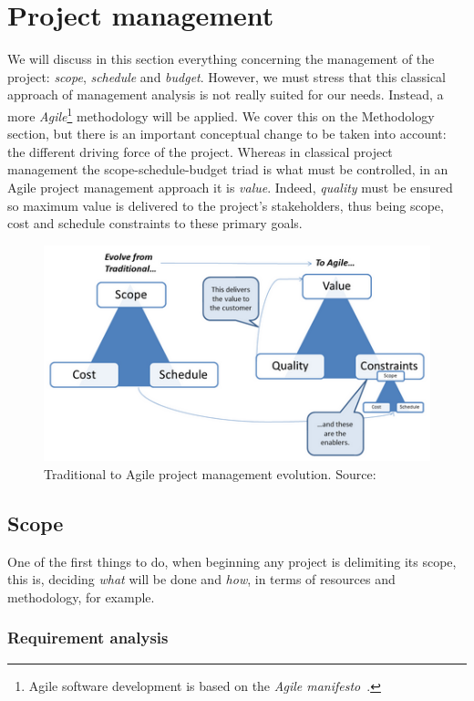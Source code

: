 \section{Project management}
\label{section:project_management}

We will discuss in this section everything concerning the management of the project: \textit{scope}, \textit{schedule} and \textit{budget}. However, we must stress that this classical approach of management analysis is not really suited for our needs. Instead, a more \textit{Agile}\footnote{Agile software development is based on the \textit{Agile manifesto}~\cite{website:AgileManifesto}.} methodology will be applied. We cover this on the Methodology section, but there is an important conceptual change to be taken into account: the different driving force of the project. Whereas in classical project management the scope-schedule-budget triad is what must be controlled, in an Agile project management approach it is \textit{value}. Indeed, \textit{quality} must be ensured so maximum value is delivered to the project's stakeholders, thus being scope, cost and schedule constraints to these primary goals.

\begin{figure}[h]
	\centering
	\includegraphics[width=0.7\linewidth]{figures/agiletriangle-1.png}
	\caption{Traditional to Agile project management evolution. Source:~\cite{website:AgileTriangle}}
	\label{fig:agile-pm}
\end{figure}

\subsection{Scope}
\label{section:scope}

One of the first things to do, when beginning any project is delimiting its scope, this is, deciding \textit{what} will be done and \textit{how}, in terms of resources and methodology, for example.

\subsubsection{Requirement analysis}

